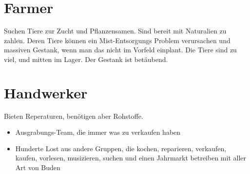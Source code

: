 \section{Farmer}

Suchen Tiere zur Zucht und Pflanzensamen. Sind bereit mit Naturalien zu zahlen. Deren Tiere können ein Mist-Entsorgungs Problem verursachen und massiven Gestank, wenn man das nicht im Vorfeld einplant. Die Tiere sind zu viel, und mitten im Lager. Der Gestank ist betäubend.


\section{Handwerker}

Bieten Reperaturen, benötigen aber Rohstoffe.

\begin{itemize}
\item Ausgrabungs-Team, die immer was zu verkaufen haben
\item Hunderte Lost aus andere Gruppen, die kochen, reparieren, verkaufen, kaufen, vorlesen, musizieren, suchen und einen Jahrmarkt betreiben mit aller Art von Buden
\end{itemize}

